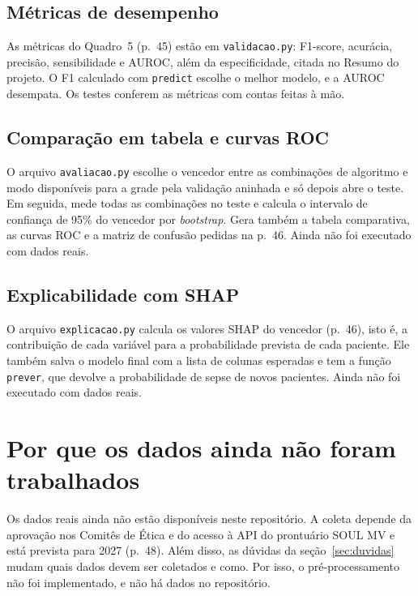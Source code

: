 \documentclass[11pt,a4paper]{article}
\newcommand{\cod}[1]{\texttt{#1}}
\begin{document}
\subsection{Métricas de desempenho}

As métricas do Quadro~5 (p.~45) estão em \cod{validacao.py}: F1-score, acurácia, precisão, sensibilidade e AUROC,
além da especificidade, citada no Resumo do projeto. O F1 calculado com \cod{predict} escolhe o melhor modelo, e a AUROC desempata.
Os testes conferem as métricas com contas feitas à mão.

\subsection{Comparação em tabela e curvas ROC}

O arquivo \cod{avaliacao.py} escolhe o vencedor entre as combinações de algoritmo e modo disponíveis para a grade pela validação aninhada e só
depois abre o teste. Em seguida, mede todas as combinações no teste e calcula o intervalo de confiança de 95\% do
vencedor por \emph{bootstrap}. Gera também a tabela comparativa, as curvas ROC e a matriz de confusão pedidas na
p.~46. Ainda não foi executado com dados reais.

\subsection{Explicabilidade com SHAP}

O arquivo \cod{explicacao.py} calcula os valores SHAP do vencedor (p.~46), isto é, a contribuição de cada variável para
a probabilidade prevista de cada paciente. Ele também salva o modelo final com a lista de colunas esperadas e tem a
função \cod{prever}, que devolve a probabilidade de sepse de novos pacientes. Ainda não foi executado com dados
reais.

\section{Por que os dados ainda não foram trabalhados}

Os dados reais ainda não estão disponíveis neste repositório. A coleta depende da aprovação nos Comitês de Ética e do acesso à API do prontuário
SOUL MV e está prevista para 2027 (p.~48). Além disso, as dúvidas da seção~\ref{sec:duvidas} mudam quais dados devem
ser coletados e como. Por isso, o pré-processamento não foi implementado, e não há dados no repositório.
\end{document}
